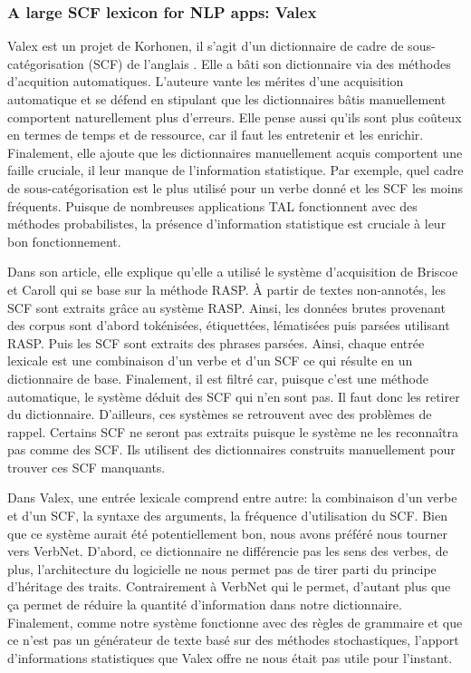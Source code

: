 \subsubsection{A large SCF lexicon for NLP apps: Valex}
 
Valex est un projet de Korhonen, il s'agit d'un dictionnaire de cadre de sous-catégorisation (SCF) de l'anglais \citep{Korhonenlargesubcategorizationlexicon2006}. Elle a bâti son dictionnaire via des méthodes d'acquition automatiques. L'auteure vante les mérites d'une acquisition automatique et se défend en stipulant que les dictionnaires bâtis manuellement comportent naturellement plus d'erreurs. Elle pense aussi qu'ils sont plus coûteux en termes de temps et de ressource, car il faut les entretenir et les enrichir. Finalement, elle ajoute que les dictionnaires manuellement acquis comportent une faille cruciale, il leur manque de l'information statistique. Par exemple, quel cadre de sous-catégorisation est le plus utilisé pour un verbe donné et les SCF les moins fréquents.  Puisque de nombreuses applications TAL fonctionnent avec des méthodes probabilistes, la présence d'information statistique est cruciale à leur bon fonctionnement.  

Dans son article, elle explique qu'elle a utilisé le système d'acquisition de Briscoe et Caroll \citep{BriscoeSecondReleaseRASP2006} qui se base sur la méthode RASP. À partir de textes non-annotés, les SCF sont extraits grâce au système RASP. Ainsi, les données brutes provenant des corpus sont d'abord tokénisées, étiquettées, lématisées puis parsées utilisant RASP. Puis les SCF sont extraits des phrases parsées. Ainsi, chaque entrée lexicale est une combinaison d'un verbe et d'un SCF ce qui résulte en un dictionnaire de base. Finalement, il est filtré car, puisque c'est une méthode automatique, le système déduit des SCF qui n'en sont pas. Il faut donc les retirer du dictionnaire. D'ailleurs, ces systèmes se retrouvent avec des problèmes de rappel. Certains SCF ne seront pas extraits puisque le système ne les reconnaîtra pas comme des SCF. Ils utilisent des dictionnaires construits manuellement pour trouver ces SCF manquants.

Dans Valex, une entrée lexicale comprend entre autre: la combinaison d'un verbe et d'un SCF, la syntaxe des arguments, la fréquence d'utilisation du SCF. Bien que ce système aurait été potentiellement bon, nous avons préféré nous tourner vers VerbNet. D'abord, ce dictionnaire ne différencie pas les sens des verbes, de plus, l'architecture du logicielle ne nous permet pas de tirer parti du principe d'héritage des traits. Contrairement à VerbNet qui le permet, d'autant plus que ça permet de réduire la quantité d'information dans notre dictionnaire. Finalement, comme notre système fonctionne avec des règles de grammaire et que ce n'est pas un générateur de texte basé sur des méthodes stochastiques, l'apport d'informations statistiques que Valex offre ne nous était pas utile pour l'instant.

